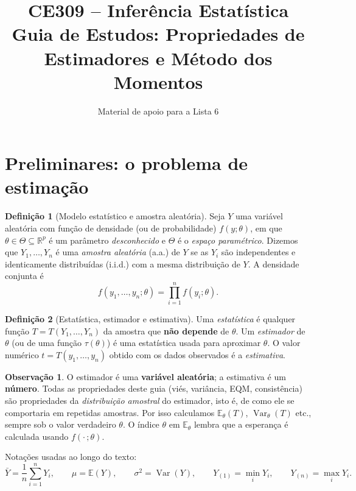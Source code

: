 \documentclass[11pt,a4paper]{article}
\title{\textbf{CE309 -- Inferência Estatística}\\[4pt]
\large Guia de Estudos: Propriedades de Estimadores e Método dos Momentos}
\author{Material de apoio para a Lista 6}
\date{}
\theoremstyle{definition}
\newtheorem{definicao}{Definição}[section]
\newtheorem{observacao}{Observação}[section]
\theoremstyle{plain}
\newcommand{\E}{\mathbb{E}}
\newcommand{\Var}{\operatorname{Var}}
\newcommand{\R}{\mathbb{R}}
\newcommand{\bY}{\bar{Y}}
\begin{document}
\maketitle
\tableofcontents
\newpage

\section{Preliminares: o problema de estimação}

\begin{definicao}[Modelo estatístico e amostra aleatória]
Seja $Y$ uma variável aleatória com função de densidade (ou de probabilidade) $f(y;\theta)$, em que $\theta \in \Theta \subseteq \R^p$ é um parâmetro \emph{desconhecido} e $\Theta$ é o \emph{espaço paramétrico}. Dizemos que $Y_1,\dots,Y_n$ é uma \emph{amostra aleatória} (a.a.) de $Y$ se as $Y_i$ são independentes e identicamente distribuídas (i.i.d.) com a mesma distribuição de $Y$. A densidade conjunta é
\[
f(y_1,\dots,y_n;\theta) = \prod_{i=1}^n f(y_i;\theta).
\]
\end{definicao}

\begin{definicao}[Estatística, estimador e estimativa]
Uma \emph{estatística} é qualquer função $T = T(Y_1,\dots,Y_n)$ da amostra que \textbf{não depende} de $\theta$. Um \emph{estimador} de $\theta$ (ou de uma função $\tau(\theta)$) é uma estatística usada para aproximar $\theta$. O valor numérico $t = T(y_1,\dots,y_n)$ obtido com os dados observados é a \emph{estimativa}.
\end{definicao}

\begin{observacao}
O estimador é uma \textbf{variável aleatória}; a estimativa é um \textbf{número}. Todas as propriedades deste guia (viés, variância, EQM, consistência) são propriedades da \emph{distribuição amostral} do estimador, isto é, de como ele se comportaria em repetidas amostras. Por isso calculamos $\E_\theta(T)$, $\Var_\theta(T)$ etc., sempre sob o valor verdadeiro $\theta$. O índice $\theta$ em $\E_\theta$ lembra que a esperança é calculada usando $f(\cdot\,;\theta)$.
\end{observacao}

Notações usadas ao longo do texto:
\[
\bY = \frac{1}{n}\sum_{i=1}^n Y_i, \qquad
\mu = \E(Y), \qquad \sigma^2 = \Var(Y), \qquad
Y_{(1)} = \min_i Y_i, \qquad Y_{(n)} = \max_i Y_i .
\]
\end{document}

